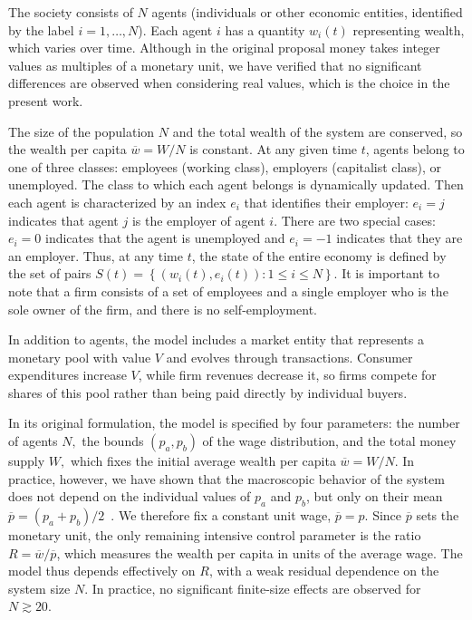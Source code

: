 \documentclass[12pt,preprint]{revtex4-1}
\begin{document}
%
The society consists of $N$ agents (individuals or other economic entities, identified by the label $i=1,\dots,N$). Each agent $i$ has a quantity $w_i(t)$ representing wealth, which varies over time. 
Although in the original proposal money takes integer values 
as multiples of a monetary unit, we have verified that no significant differences are observed when considering  real values, which is the choice in the present work.

The size of the population $N$ and the total wealth of the system are conserved, so the wealth per capita $\overline{w}=W/N$ is constant.
At any given time $t$, agents belong to one of three classes: employees (working class), employers (capitalist class), or unemployed. The class to which each agent belongs is dynamically updated. 
Then each  agent is characterized by an index $e_i$ that identifies their employer: $e_i=j$ indicates that agent $j$ is the employer of agent $i$. There are two special cases: $e_i=0$ indicates that the agent is unemployed and $e_i=-1$ indicates that they are an employer.  
Thus, at any time $t$, the state of the entire economy is defined by the set of pairs $S(t) = \left\{ \left( w_i(t), e_i(t) \right) :1\leq i\leq N \right\}$. It is important to note that a firm consists of a set of employees and a single  employer who is the sole owner of the firm, and there is no self-employment.

In addition to agents, the model includes a market entity that represents a monetary pool with value $V$ and evolves through transactions. Consumer expenditures increase $V$, while firm revenues decrease it, so firms compete for shares of this pool rather than being paid directly by individual buyers.

In its original formulation, the model is specified by four parameters: the number of agents $N,$ the bounds $(p_a,p_b)$ of the wage distribution, and the total money supply $W,$ which fixes the initial average wealth per capita $\overline{w} = W/N$. In practice, however, we have shown that the macroscopic behavior of the system does not depend on the individual values of $p_a$ and $p_b$, but only on their mean $\overline{p}=(p_a+p_b)/2$~\cite{Borba2025}. We therefore fix a constant unit wage, $\overline{p}=p$.
Since $\overline{p}$ sets the monetary unit, the only remaining intensive control parameter is the ratio $R=\overline{w}/\overline{p}$, which measures the wealth per capita in units of the average wage. The model thus depends effectively on $R$, with a weak residual dependence on the system size $N$. In practice, no significant finite-size effects are observed for $N \gtrsim 20$.
\end{document}
